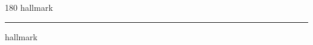 
\begin{frame}
\begin{center}
\begin{turn}{180}
{\fontsize{2.5cm}{1em}\selectfont hallmark}
\end{turn}
\vspace{1em}\par  
\hrule
\vspace{1em}\par  
{\fontsize{2.5cm}{1em}\selectfont hallmark}
\end{center}
\end{frame}
